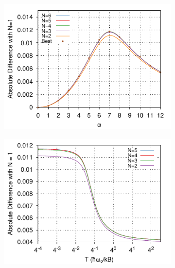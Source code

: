 \begin{figure}[!tbp]
    \centering
  \begin{subfigure}[b]{0.49\textwidth}
    \centering
    \includegraphics[width=\textwidth]{chapters/trialmodel/figures/frohlich-3d-multivariate-alpha-0to12-beta-inf-N-1to6-COLOUR.pdf}
  \end{subfigure}
  \begin{subfigure}[b]{0.49\textwidth}
    \centering
    \includegraphics[width=\textwidth]{figures/frohlich-3d-multivariate-energy-alpha-7-temp-00078125to32-N-1to5-COLOUR.pdf}
  \end{subfigure}
  \begin{subfigure}[b]{0.49\textwidth}
    \centering

\end{subfigure}
\end{figure}
